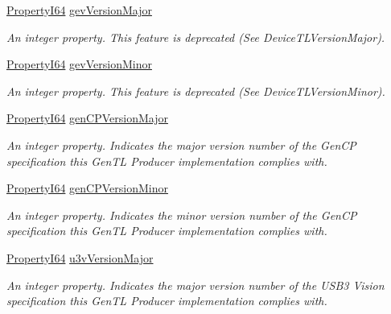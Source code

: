 \begin{DoxyCompactItemize}
\hyperlink{group___common_interface_ga81749b2696755513663492664a18a893}{Property\+I64} \hyperlink{classmv_i_m_p_a_c_t_1_1acquire_1_1_gen_i_cam_1_1_device_module_a6c6ae00a97052ba073dc23b69b02936c}{gev\+Version\+Major}
\begin{DoxyCompactList}\small\item\em An integer property. This feature is deprecated (See Device\+T\+L\+Version\+Major). \end{DoxyCompactList}\item 
\hyperlink{group___common_interface_ga81749b2696755513663492664a18a893}{Property\+I64} \hyperlink{classmv_i_m_p_a_c_t_1_1acquire_1_1_gen_i_cam_1_1_device_module_afaf53a88b30e32fc35ed8f68ddbd3b46}{gev\+Version\+Minor}
\begin{DoxyCompactList}\small\item\em An integer property. This feature is deprecated (See Device\+T\+L\+Version\+Minor). \end{DoxyCompactList}\item 
\hyperlink{group___common_interface_ga81749b2696755513663492664a18a893}{Property\+I64} \hyperlink{classmv_i_m_p_a_c_t_1_1acquire_1_1_gen_i_cam_1_1_device_module_a2d45de4ae220c0c4f028c2b7cabdc74b}{gen\+C\+P\+Version\+Major}
\begin{DoxyCompactList}\small\item\em An integer property. Indicates the major version number of the Gen\+C\+P specification this Gen\+T\+L Producer implementation complies with. \end{DoxyCompactList}\item 
\hyperlink{group___common_interface_ga81749b2696755513663492664a18a893}{Property\+I64} \hyperlink{classmv_i_m_p_a_c_t_1_1acquire_1_1_gen_i_cam_1_1_device_module_aa5487e1d2944234b6e71abb1715d2982}{gen\+C\+P\+Version\+Minor}
\begin{DoxyCompactList}\small\item\em An integer property. Indicates the minor version number of the Gen\+C\+P specification this Gen\+T\+L Producer implementation complies with. \end{DoxyCompactList}\item 
\hyperlink{group___common_interface_ga81749b2696755513663492664a18a893}{Property\+I64} \hyperlink{classmv_i_m_p_a_c_t_1_1acquire_1_1_gen_i_cam_1_1_device_module_adc21a4ebdc3dc22a2c86be4b735aedff}{u3v\+Version\+Major}
\begin{DoxyCompactList}\small\item\em An integer property. Indicates the major version number of the U\+S\+B3 Vision specification this Gen\+T\+L Producer implementation complies with. \end{DoxyCompactList}\item 

\end{DoxyCompactItemize}
